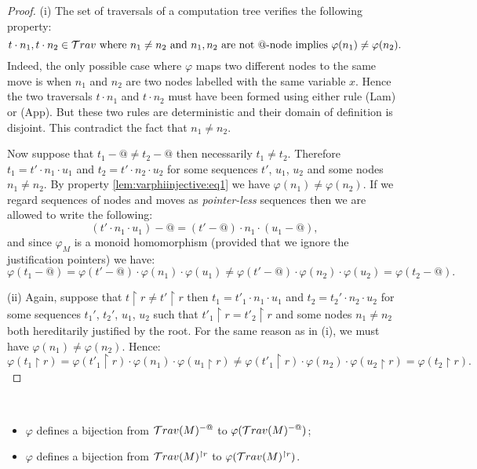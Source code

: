 \begin{proof}
(i) The set of traversals of a computation tree verifies the following property:
\begin{equation}
t \cdot n_1, t \cdot n_2 \in \mathcal{T}rav \mbox{ where } n_1 \neq n_2 \mbox{ and $n_1, n_2$ are not @-node implies } \varphi(n_1) \neq \varphi(n_2). \label{lem:varphiinjective:eq1}
\end{equation}
Indeed, the only possible case where $\varphi$ maps two different
nodes to the same move is when $n_1$ and $n_2$ are two nodes
labelled with the same variable $x$. Hence the two traversals $t
\cdot n_1$ and $t \cdot n_2$ must have been formed using either rule
(Lam) or (App). But these two rules are deterministic and their
domain of definition is disjoint. This contradict the fact that $n_1
\neq n_2$.

Now suppose that $t_1-@\neq t_2-@$ then necessarily $t_1 \neq t_2$. Therefore
 $t_1 = t' \cdot n_1 \cdot u_1$ and $t_2 = t' \cdot n_2 \cdot u_2$ for some sequences $t'$, $u_1$, $u_2$
and some nodes $n_1\neq n_2$. By property \ref{lem:varphiinjective:eq1} we have $\varphi(n_1) \neq \varphi(n_2)$.
If we regard sequences of nodes and moves as \emph{pointer-less} sequences then we are allowed to write the following:
$$ (t' \cdot n_1 \cdot u_1) - @ = (t' - @) \cdot n_1 \cdot (u_1 -@),$$
and since $\varphi_M$ is a monoid homomorphism (provided that we ignore the justification pointers) we have:
$$ \varphi(t_1-@) = \varphi(t'-@) \cdot \varphi(n_1) \cdot \varphi(u_1) \neq \varphi(t'-@) \cdot \varphi(n_2) \cdot \varphi(u_2) = \varphi(t_2-@).$$

(ii) Again, suppose that $t \upharpoonright r \neq t' \upharpoonright r$ then
 $t_1 = t'_1 \cdot n_1 \cdot u_1$ and $t_2 = t_2' \cdot n_2 \cdot u_2$ for some sequences $t_1'$, $t_2'$, $u_1$, $u_2$
 such that $t'_1 \upharpoonright r = t'_2 \upharpoonright r $
and some nodes $n_1 \neq n_2$ both hereditarily justified by the root.
For the same reason as in (i), we must have $\varphi(n_1) \neq \varphi(n_2)$. Hence:
$$ \varphi(t_1\upharpoonright r) =
        \varphi(t'_1\upharpoonright r) \cdot \varphi(n_1) \cdot \varphi(u_1 \upharpoonright r)
    \neq \varphi(t'_1\upharpoonright r) \cdot \varphi(n_2) \cdot \varphi(u_2 \upharpoonright r)
         = \varphi(t_2\upharpoonright r).$$
\end{proof}

\begin{cor} \
\label{cor:varphi_bij}
\begin{itemize}
\item[(i)] $\varphi$ defines a bijection from $\mathcal{T}rav(M)^{-@}$
to $\varphi(\mathcal{T}rav(M)^{-@})$;
\item[(ii)] $\varphi$ defines a bijection from $\mathcal{T}rav(M)^{\upharpoonright r}$ to
$\varphi(\mathcal{T}rav(M)^{\upharpoonright r})$.
\end{itemize}
\end{cor}

